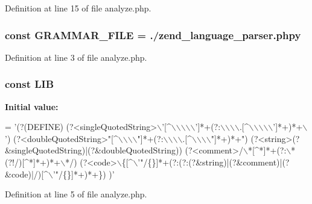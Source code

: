 Definition at line 15 of file analyze.\+php.

\subsubsection[{G\+R\+A\+M\+M\+A\+R\+\_\+\+F\+I\+L\+E}]{\setlength{\rightskip}{0pt plus 5cm}const G\+R\+A\+M\+M\+A\+R\+\_\+\+F\+I\+L\+E = \textquotesingle{}./zend\+\_\+language\+\_\+parser.\+phpy\textquotesingle{}}\label{analyze_8php_aac66d28edc09c4c097e692e00f085005}


Definition at line 3 of file analyze.\+php.

\subsubsection[{L\+I\+B}]{\setlength{\rightskip}{0pt plus 5cm}const L\+I\+B}\label{analyze_8php_a514527ec3eba1a596624e43baa4c9373}
{\bfseries Initial value\+:}
\begin{DoxyCode}
= \textcolor{stringliteral}{'(?(DEFINE)}
\textcolor{stringliteral}{    (?<singleQuotedString>\(\backslash\)'[^\(\backslash\)\(\backslash\)\(\backslash\)\(\backslash\)\(\backslash\)']*+(?:\(\backslash\)\(\backslash\)\(\backslash\)\(\backslash\).[^\(\backslash\)\(\backslash\)\(\backslash\)\(\backslash\)\(\backslash\)']*+)*+\(\backslash\)')}
\textcolor{stringliteral}{    (?<doubleQuotedString>"[^\(\backslash\)\(\backslash\)\(\backslash\)\(\backslash\)"]*+(?:\(\backslash\)\(\backslash\)\(\backslash\)\(\backslash\).[^\(\backslash\)\(\backslash\)\(\backslash\)\(\backslash\)"]*+)*+")}
\textcolor{stringliteral}{    (?<string>(?&singleQuotedString)|(?&doubleQuotedString))}
\textcolor{stringliteral}{    (?<comment>/\(\backslash\)*[^*]*+(?:\(\backslash\)*(?!/)[^*]*+)*+\(\backslash\)*/)}
\textcolor{stringliteral}{    (?<code>\(\backslash\)\{[^\(\backslash\)'"/\{\}]*+(?:(?:(?&string)|(?&comment)|(?&code)|/)[^\(\backslash\)'"/\{\}]*+)*+\})}
\textcolor{stringliteral}{)'}
\end{DoxyCode}


Definition at line 5 of file analyze.\+php.

